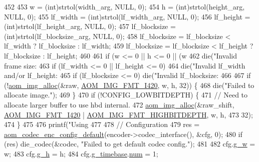 \begin{DoxyCodeInclude}
{{{{{{{{{{452 
453   w = (int)strtol(width\_arg, NULL, 0);
454   h = (int)strtol(height\_arg, NULL, 0);
455   lf\_width = (int)strtol(lf\_width\_arg, NULL, 0);
456   lf\_height = (int)strtol(lf\_height\_arg, NULL, 0);
457   lf\_blocksize = (int)strtol(lf\_blocksize\_arg, NULL, 0);
458   lf\_blocksize = lf\_blocksize < lf\_width ? lf\_blocksize : lf\_width;
459   lf\_blocksize = lf\_blocksize < lf\_height ? lf\_blocksize : lf\_height;
460 
461   \textcolor{keywordflow}{if} (w <= 0 || h <= 0 || (w %
462     die(\textcolor{stringliteral}{"Invalid frame size: %
463   \textcolor{keywordflow}{if} (lf\_width <= 0 || lf\_height <= 0)
464     die(\textcolor{stringliteral}{"Invalid lf\_width and/or lf\_height: %
465   \textcolor{keywordflow}{if} (lf\_blocksize <= 0) die(\textcolor{stringliteral}{"Invalid lf\_blocksize: %
466 
467   \textcolor{keywordflow}{if} (!\hyperlink{aom__image_8h_a570db29fbd122951235a08fe9375f6bb}{aom\_img\_alloc}(&raw, \hyperlink{aom__image_8h_a930317c04b4bd0a660bb5e744055523cabd778a3d697463e89d12a1117f417b60}{AOM\_IMG\_FMT\_I420}, w, h, 32)) \{
468     die(\textcolor{stringliteral}{"Failed to allocate image."});
469   \}
470   \textcolor{keywordflow}{if} (!CONFIG\_LOWBITDEPTH) \{
471     \textcolor{comment}{// Need to allocate larger buffer to use hbd internal.}
472     \hyperlink{aom__image_8h_a570db29fbd122951235a08fe9375f6bb}{aom\_img\_alloc}(&raw\_shift, \hyperlink{aom__image_8h_a930317c04b4bd0a660bb5e744055523cabd778a3d697463e89d12a1117f417b60}{AOM\_IMG\_FMT\_I420} | 
      \hyperlink{aom__image_8h_a607b37d91f75442f54223ecd85f1b6cb}{AOM\_IMG\_FMT\_HIGHBITDEPTH}, w, h,
473                   32);
474   \}
475 
476   printf(\textcolor{stringliteral}{"Using %
477 
478   \textcolor{comment}{// Configuration}
479   res = \hyperlink{group__encoder_gabe456ab6f99bdebc47018779b75d2521}{aom\_codec\_enc\_config\_default}(encoder->codec\_interface(), &cfg, 0);
480   \textcolor{keywordflow}{if} (res) die\_codec(&codec, \textcolor{stringliteral}{"Failed to get default codec config."});
481 
482   cfg.\hyperlink{structaom__codec__enc__cfg_a80cb459c5ef3c7e1516f617c4c9d6eab}{g\_w} = w;
483   cfg.\hyperlink{structaom__codec__enc__cfg_a37b0f57b63bec8d133df8901d4407ee6}{g\_h} = h;
484   cfg.\hyperlink{structaom__codec__enc__cfg_a10664f1fc5b6ec29b77ee13efeeecdf7}{g\_timebase}.\hyperlink{structaom__rational_a7b48174411798c780a15f132c4650839}{num} = 1;
}}}}}}}}}}}}}}
\end{DoxyCodeInclude}
